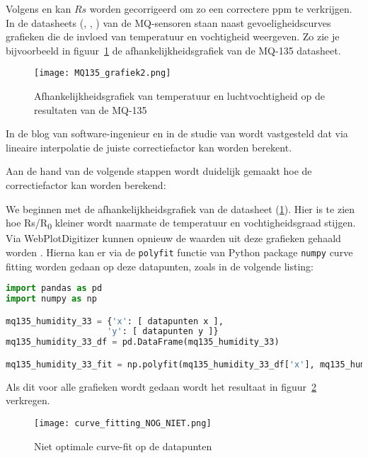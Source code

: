 Volgens \textcite{Kalra2016} en \textcite{Cornelius2023} kan $Rs$ worden gecorrigeerd om zo een correctere ppm te verkrijgen. In de datasheets (\autocite{mq4}, \autocite{mq7}, \autocite{mq135}) van de MQ-sensoren staan naast gevoeligheidscurves grafieken die de invloed van temperatuur en vochtigheid weergeven. Zo zie je bijvoorbeeld in figuur~\ref{fig:MQ135_grafiek2} de afhankelijkheidsgrafiek van de MQ-135 datasheet.

\begin{figure}[h]
    \texttt{[image: MQ135\_grafiek2.png]}
    \caption[Afhankelijkheid temperatuur en luchtvochtigheid op MQ-135]{Afhankelijkheidsgrafiek van temperatuur en luchtvochtigheid op de resultaten van de MQ-135 \autocite{mq135}}
    \label{fig:MQ135_grafiek2}
\end{figure}

In de blog van software-ingenieur \textcite{Gironi20172} en in de studie van \textcite{Sukhdev2022} wordt vastgesteld dat via lineaire interpolatie de juiste correctiefactor kan worden berekent.

Aan de hand van de volgende stappen wordt duidelijk gemaakt hoe de correctiefactor kan worden berekend:

We beginnen met de afhankelijkheidsgrafiek van de datasheet (\ref{fig:MQ135_grafiek2}). Hier is te zien hoe Rs/R\textsubscript{0} kleiner wordt naarmate de temperatuur en vochtigheidsgraad stijgen. Via WebPlotDigitizer kunnen opnieuw de waarden uit deze grafieken gehaald worden \autocite{Rohatgi2024}. Hierna kan er via de \verb|polyfit| functie van Python package \verb|numpy| curve fitting worden gedaan op deze datapunten, zoals in de volgende listing:
\begin{lstlisting}[language=Python, caption={Curve fitting in Python}]
import pandas as pd
import numpy as np

mq135_humidity_33 = {'x': [ datapunten x ],
                    'y': [ datapunten y ]}
mq135_humidity_33_df = pd.DataFrame(mq135_humidity_33)

mq135_humidity_33_fit = np.polyfit(mq135_humidity_33_df['x'], mq135_humidity_33_df['y'], 2) #functie van de 2de graad

\end{lstlisting}

Als dit voor alle grafieken wordt gedaan wordt het resultaat in figuur~\ref{fig:curve_fitting_NOG_NIET} verkregen.

\begin{figure}[h]
    \texttt{[image: curve\_fitting\_NOG\_NIET.png]}
    \caption[Niet optimale curve-fit op de datapunten]{Niet optimale curve-fit op de datapunten}
    \label{fig:curve_fitting_NOG_NIET}
\end{figure}

